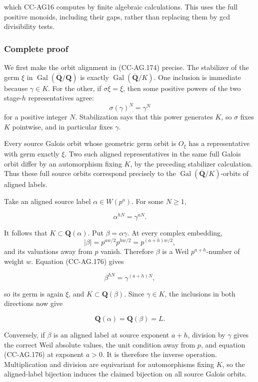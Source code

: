 which CC-AG16 computes by finite algebraic calculations. This uses the
full positive monoids, including their gaps, rather than replacing them
by gcd divisibility tests.

\subsubsection{Complete proof}\label{complete-proof}

We first make the orbit alignment in (CC-AG.174) precise. The stabilizer
of the germ \(\xi\) in
\(\operatorname{Gal}(\overline{\mathbf Q}/\mathbf Q)\) is exactly
\(\operatorname{Gal}(\overline{\mathbf Q}/K)\). One inclusion is
immediate because \(\gamma\in K\). For the other, if \(\sigma\xi=\xi\),
then some positive powers of the two stage-\(h\) representatives agree:
\[
                         \sigma(\gamma)^N=\gamma^N
\] for a positive integer \(N\). Stabilization says that this power
generates \(K\), so \(\sigma\) fixes \(K\) pointwise, and in particular
fixes \(\gamma\).

Every source Galois orbit whose geometric germ orbit is \(O_\xi\) has a
representative with germ exactly \(\xi\). Two such aligned
representatives in the same full Galois orbit differ by an automorphism
fixing \(K\), by the preceding stabilizer calculation. Thus these full
source orbits correspond precisely to the
\(\operatorname{Gal}(\overline{\mathbf Q}/K)\)-orbits of aligned labels.

Take an aligned source label \(\alpha\in W(p^a)\). For some \(N\ge1\),

\[
                         \alpha^{hN}=\gamma^{aN}.
 \tag{CC-AG.176}
\]

It follows that \(K\subset\mathbf Q(\alpha)\). Put
\(\beta=\alpha\gamma\). At every complex embedding, \[
 |\beta|=p^{aw/2}p^{hw/2}=p^{(a+h)w/2},
\] and its valuations away from \(p\) vanish. Therefore \(\beta\) is a
Weil \(p^{a+h}\)-number of weight \(w\). Equation (CC-AG.176) gives

\[
                        \beta^{hN}=\gamma^{(a+h)N},
 \tag{CC-AG.177}
\]

so its germ is again \(\xi\), and \(K\subset\mathbf Q(\beta)\). Since
\(\gamma\in K\), the inclusions in both directions now give

\[
                       \mathbf Q(\alpha)=\mathbf Q(\beta)=L.
 \tag{CC-AG.178}
\]

Conversely, if \(\beta\) is an aligned label at source exponent \(a+h\),
division by \(\gamma\) gives the correct Weil absolute values, the unit
condition away from \(p\), and equation (CC-AG.176) at exponent \(a>0\).
It is therefore the inverse operation. Multiplication and division are
equivariant for automorphisms fixing \(K\), so the aligned-label
bijection induces the claimed bijection on all source Galois orbits.

